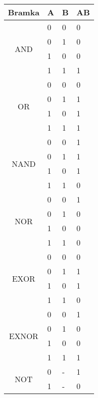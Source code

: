 \documentclass[12pt, letterpaper, titlepage]{article}
\begin{document}
\begin{center}
\begin{table}[h]
\begin{tabular}{|c|l|l|l|}
\hline
			  Bramka & A & B & AB \\ \hline
\multirow{4}{*}{AND} & 0 & 0 & 0 \\ \cline{2-4} 
                     & 0 & 1 & 0 \\ \cline{2-4} 
                     & 1 & 0 & 0 \\ \cline{2-4} 
                     & 1 & 1 & 1 \\ \hline \hline

\multirow{4}{*}{OR} & 0 & 0 & 0 \\ \cline{2-4} 
                     & 0 & 1 & 1 \\ \cline{2-4} 
                     & 1 & 0 & 1 \\ \cline{2-4} 
                     & 1 & 1 & 1 \\ \hline \hline

\multirow{4}{*}{NAND} & 0 & 0 & 1 \\ \cline{2-4} 
                     & 0 & 1 & 1 \\ \cline{2-4} 
                     & 1 & 0 & 1 \\ \cline{2-4} 
                     & 1 & 1 & 0 \\ \hline \hline

\multirow{4}{*}{NOR} & 0 & 0 & 1 \\ \cline{2-4} 
                     & 0 & 1 & 0 \\ \cline{2-4} 
                     & 1 & 0 & 0 \\ \cline{2-4} 
                     & 1 & 1 & 0 \\ \hline \hline
                     
\multirow{4}{*}{EXOR} & 0 & 0 & 0 \\ \cline{2-4} 
                     & 0 & 1 & 1 \\ \cline{2-4} 
                     & 1 & 0 & 1 \\ \cline{2-4} 
                     & 1 & 1 & 0 \\ \hline \hline

\multirow{4}{*}{EXNOR} & 0 & 0 & 1 \\ \cline{2-4} 
                     & 0 & 1 & 0 \\ \cline{2-4} 
                     & 1 & 0 & 0 \\ \cline{2-4} 
                     & 1 & 1 & 1 \\ \hline \hline
                     
\multirow{2}{*}{NOT} & 0 & - & 1 \\ \cline{2-4} 
                     & 1 & - & 0 \\ \hline 
                     
\end{tabular}
\end{table}

\end{center}
\end{document}
